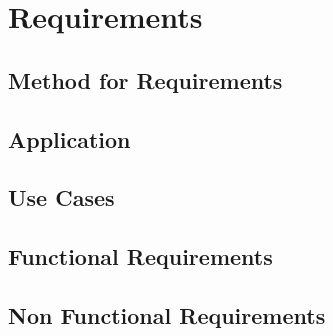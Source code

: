 \chapter{Requirements}
\label{requirements}

\section{Method for Requirements}

\section{Application}

\section{Use Cases}

\section{Functional Requirements}

\section{Non Functional Requirements}
